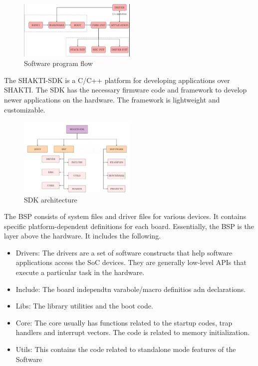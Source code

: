 \begin{figure}[H]
    \centering
    \includegraphics[width = 0.5\textwidth]{./FPGA_Implementation/SoftwareProgramflow.png}
    \caption{Software program flow}
\end{figure}

The SHAKTI-SDK is a C/C++ platform for developing applications over SHAKTI. The SDK has the necessary firmware code and framework to develop newer applications on the hardware. The framework is lightweight and customizable.

\begin{figure}[H]
    \centering
    \includegraphics[width = 0.5\textwidth]{./FPGA_Implementation/SDK_architecture.jpg}
    \caption{SDK architecture}
\end{figure}

The BSP consists of system files and driver files for various devices. It contains specific platform-dependent definitions for each board. Essentially, the BSP is the layer above the hardware. It includes the following.

\begin{itemize}
	\itemsep0em 
	\item Drivers: The drivers are a set of software constructs that help software applications access the SoC devices. They are generally low-level APIs that execute a particular task in the hardware.
	\item Include: The board independtn varabole/macro definitios adn declarations.
	\item Libs: The library utilities and the boot code.
	\item Core: The core usually has functions related to the startup codes, trap handlers and interrupt vectors. The code is related to memory initialization.
	\item Utils: This contains the code related to standalone mode features of the Software 
\end{itemize}

